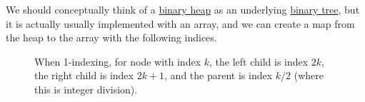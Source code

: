   We should conceptually think of a \hyperref[def:binary-heap]{binary heap} as an underlying \hyperref[def:binary-tree]{binary tree}, but it is actually usually implemented with an array, and we can create a map from the heap to the array with the following indices. 

  \begin{figure}[H]
    \centering 
    \caption{When 1-indexing, for node with index $k$, the left child is index $2k$, the right child is index $2k + 1$, and the parent is index $k/2$ (where this is integer division). } 
    \label{fig:binary_heap_array}
  \end{figure}

